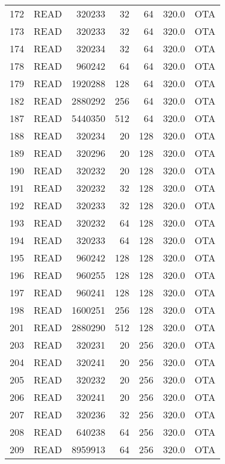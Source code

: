 \begin{longtable}{llrrrrl}
172 &         READ &    320233 &         32 &        64 &          320.0 &  OTA \\
173 &         READ &    320233 &         32 &        64 &          320.0 &  OTA \\
174 &         READ &    320234 &         32 &        64 &          320.0 &  OTA \\
178 &         READ &    960242 &         64 &        64 &          320.0 &  OTA \\
179 &         READ &   1920288 &        128 &        64 &          320.0 &  OTA \\
182 &         READ &   2880292 &        256 &        64 &          320.0 &  OTA \\
187 &         READ &   5440350 &        512 &        64 &          320.0 &  OTA \\
188 &         READ &    320234 &         20 &       128 &          320.0 &  OTA \\
189 &         READ &    320296 &         20 &       128 &          320.0 &  OTA \\
190 &         READ &    320232 &         20 &       128 &          320.0 &  OTA \\
191 &         READ &    320232 &         32 &       128 &          320.0 &  OTA \\
192 &         READ &    320233 &         32 &       128 &          320.0 &  OTA \\
193 &         READ &    320232 &         64 &       128 &          320.0 &  OTA \\
194 &         READ &    320233 &         64 &       128 &          320.0 &  OTA \\
195 &         READ &    960242 &        128 &       128 &          320.0 &  OTA \\
196 &         READ &    960255 &        128 &       128 &          320.0 &  OTA \\
197 &         READ &    960241 &        128 &       128 &          320.0 &  OTA \\
198 &         READ &   1600251 &        256 &       128 &          320.0 &  OTA \\
201 &         READ &   2880290 &        512 &       128 &          320.0 &  OTA \\
203 &         READ &    320231 &         20 &       256 &          320.0 &  OTA \\
204 &         READ &    320241 &         20 &       256 &          320.0 &  OTA \\
205 &         READ &    320232 &         20 &       256 &          320.0 &  OTA \\
206 &         READ &    320241 &         20 &       256 &          320.0 &  OTA \\
207 &         READ &    320236 &         32 &       256 &          320.0 &  OTA \\
208 &         READ &    640238 &         64 &       256 &          320.0 &  OTA \\
209 &         READ &   8959913 &         64 &       256 &          320.0 &  OTA \\
\end{longtable}
